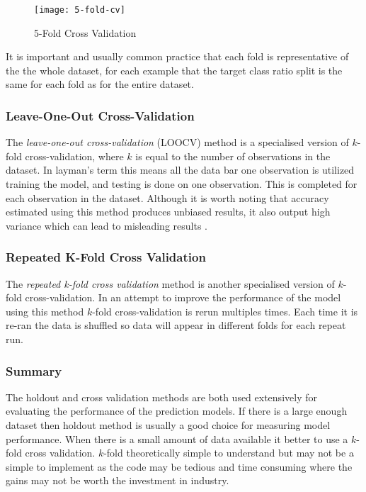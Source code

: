 \begin{figure}[H]
	\texttt{[image: 5-fold-cv]}
	\caption{5-Fold Cross Validation}
	\label{fig:5-fold-cv}
\end{figure}

It is important and usually common practice that each fold is representative of the the whole dataset, for each example that the target class ratio split is the same for each fold as for the entire dataset. 

\subsubsection{Leave-One-Out Cross-Validation}
The \textit{leave-one-out cross-validation} (LOOCV) method is a specialised version of $k$-fold cross-validation, where $k$ is equal to the number of observations in the dataset. In layman's term this means all the data bar one observation is utilized training the model, and testing is done on one observation. This is completed for each observation in the dataset. Although it is worth noting that accuracy estimated using this method produces unbiased results, it also output high variance which can lead to misleading results \citep{refaeilzadeh_cross-validation_2009}.
 

\subsubsection{Repeated K-Fold Cross Validation}
The \textit{repeated k-fold cross validation} method is another specialised version of $k$-fold cross-validation. In an attempt to improve the performance of the model using this method $k$-fold cross-validation is rerun multiples times. Each time it is re-ran the data is shuffled so data will appear in different folds for each repeat run. 

\subsubsection{Summary}

The holdout and cross validation methods are both used extensively for evaluating the performance of the prediction models. If there is a large enough dataset then holdout method is usually a good choice for measuring model performance. When there is a small amount of data available it better to use a $k$-fold cross validation. $k$-fold theoretically simple to understand but may not be a simple to implement as the code may be tedious and time consuming where the gains may not be worth the investment in industry. 

